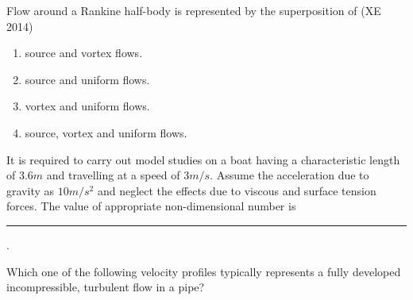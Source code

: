 \iffalse
\title{XE-2014-27-39}
\author{EE24BTECH11041-Mohit}
\section{XE}
\chapter{2014}
\fi

\item Flow around a Rankine half-body is represented by the superposition of
\hfill{(XE 2014)}
\begin{enumerate}

\item source and vortex flows.
\item source and uniform flows.
\item vortex and uniform flows.
\item source, vortex and uniform flows.

\end{enumerate}


\item It is required to carry out model studies on a boat having a characteristic length of $3.6 m$ and travelling at a speed of $3 m/s$. Assume the acceleration due to gravity as $10 m/s^{2}$ and neglect the effects due to viscous and surface tension forces. The value of appropriate non-dimensional number is \rule{2cm}{0.4pt}.

\item Which one of the following velocity profiles typically represents a fully developed incompressible, turbulent flow in a pipe? 

